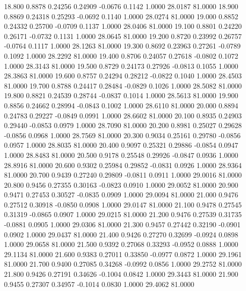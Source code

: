   18.800   0.8878   0.24256   0.24909  -0.0676   0.1142   1.0000  28.0187  81.0000
  18.900   0.8869   0.24318   0.25293  -0.0692   0.1140   1.0000  28.0274  81.0000
  19.000   0.8852   0.24332   0.25700  -0.0709   0.1137   1.0000  28.0406  81.0000
  19.100   0.8801   0.24220   0.26171  -0.0732   0.1131   1.0000  28.0645  81.0000
  19.200   0.8720   0.23992   0.26757  -0.0764   0.1117   1.0000  28.1263  81.0000
  19.300   0.8692   0.23963   0.27261  -0.0789   0.1092   1.0000  28.2292  81.0000
  19.400   0.8706   0.24057   0.27618  -0.0802   0.1072   1.0000  28.3143  81.0000
  19.500   0.8729   0.24173   0.27926  -0.0813   0.1055   1.0000  28.3863  81.0000
  19.600   0.8757   0.24294   0.28212  -0.0822   0.1040   1.0000  28.4503  81.0000
  19.700   0.8788   0.24417   0.28484  -0.0829   0.1026   1.0000  28.5082  81.0000
  19.800   0.8821   0.24539   0.28744  -0.0837   0.1014   1.0000  28.5613  81.0000
  19.900   0.8856   0.24662   0.28994  -0.0843   0.1002   1.0000  28.6110  81.0000
  20.000   0.8894   0.24783   0.29227  -0.0849   0.0991   1.0000  28.6602  81.0000
  20.100   0.8935   0.24903   0.29440  -0.0853   0.0979   1.0000  28.7090  81.0000
  20.200   0.8981   0.25027   0.29628  -0.0856   0.0968   1.0000  28.7569  81.0000
  20.300   0.9034   0.25161   0.29780  -0.0856   0.0957   1.0000  28.8035  81.0000
  20.400   0.9097   0.25321   0.29886  -0.0854   0.0947   1.0000  28.8483  81.0000
  20.500   0.9178   0.25548   0.29926  -0.0847   0.0936   1.0000  28.8916  81.0000
  20.600   0.9302   0.25984   0.29852  -0.0831   0.0926   1.0000  28.9364  81.0000
  20.700   0.9439   0.27240   0.29809  -0.0811   0.0911   1.0000  29.0016  81.0000
  20.800   0.9456   0.27355   0.30163  -0.0823   0.0910   1.0000  29.0052  81.0000
  20.900   0.9471   0.27453   0.30527  -0.0835   0.0909   1.0000  29.0094  81.0000
  21.000   0.9476   0.27512   0.30918  -0.0850   0.0908   1.0000  29.0147  81.0000
  21.100   0.9478   0.27545   0.31319  -0.0865   0.0907   1.0000  29.0215  81.0000
  21.200   0.9476   0.27539   0.31735  -0.0881   0.0905   1.0000  29.0306  81.0000
  21.300   0.9457   0.27442   0.32190  -0.0901   0.0902   1.0000  29.0437  81.0000
  21.400   0.9426   0.27270   0.32699  -0.0924   0.0898   1.0000  29.0658  81.0000
  21.500   0.9392   0.27068   0.33293  -0.0952   0.0888   1.0000  29.1134  81.0000
  21.600   0.9383   0.27011   0.33850  -0.0977   0.0872   1.0000  29.1961  81.0000
  21.700   0.9400   0.27085   0.34268  -0.0992   0.0856   1.0000  29.2752  81.0000
  21.800   0.9426   0.27191   0.34626  -0.1004   0.0842   1.0000  29.3443  81.0000
  21.900   0.9455   0.27307   0.34957  -0.1014   0.0830   1.0000  29.4062  81.0000
